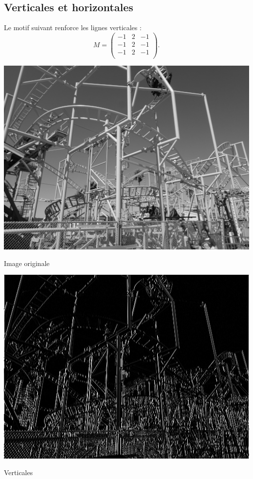 \documentclass[11pt,class=report,crop=false]{standalone}
\begin{document}
\subsection{Verticales et horizontales}

Le motif suivant renforce les lignes verticales :
$$M = 
\begin{pmatrix}
-1&2&-1\\
-1&2&-1\\
-1&2&-1\\
\end{pmatrix}.$$

\begin{center}
	\begin{minipage}{0.45\textwidth}\center
       \includegraphics[scale=\myscale,scale=0.4]{figures/image_verticales_avant}
	
	Image originale
	\end{minipage}
	\begin{minipage}{0.45\textwidth}\center
	 \includegraphics[scale=\myscale,scale=0.4]{figures/image_verticales_apres}
	
	Verticales
    \end{minipage}	
\end{center}
\end{document}
